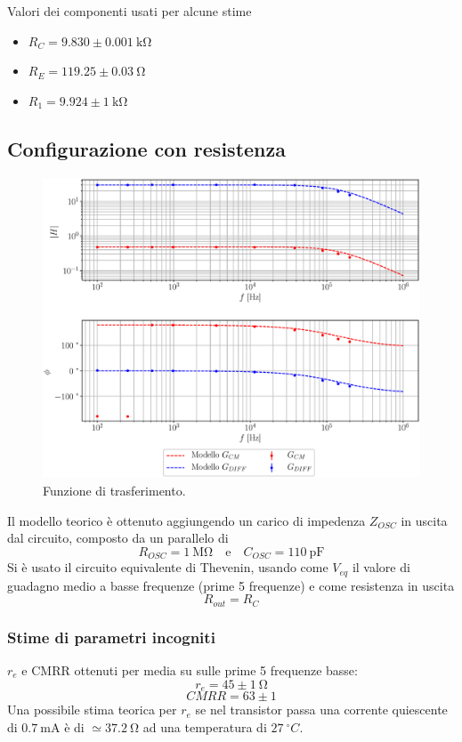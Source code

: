 \documentclass[.../presentazione_orale.tex]{subfiles}
\date{Settembre 2020}
\author{Matteo Zortea, Elena Acinapura}}
\begin{document}
\onlyinsubfile{\maketitle}

Valori dei componenti usati per alcune stime
\begin{itemize}
    \item ${R_C} = 9.830\pm0.001~\si{\kilo\ohm}$ 
    \item ${R_E} = 119.25\pm0.03~\si{\ohm}$
    \item $R_1 = 9.924\pm1~\si{\kilo\ohm}$
\end{itemize}


\subsection*{Configurazione con resistenza}
\begin{figure}[h!]
    \centering
    \includegraphics[scale = 0.6]{Grafici/resistenza.eps}
    \caption{Funzione di trasferimento.}
    \label{fig:resistenza}
\end{figure}
Il modello teorico è ottenuto aggiungendo un carico di impedenza $Z_{OSC}$ in uscita dal circuito, composto da un parallelo di $$R_{OSC} = 1~\si{\mega\ohm} \quad \text{e} \quad C_{OSC} = 110~\si{\pico\farad}$$
Si è usato il circuito equivalente di Thevenin, usando come $V_{eq}$ il valore di guadagno medio a basse frequenze (prime 5 frequenze) e come resistenza in uscita $$R_{out} = R_C$$

\subsubsection*{Stime di parametri incogniti}
$r_e$ e CMRR ottenuti per media su sulle prime 5 frequenze basse:
$$ r_e = 45\pm 1~\si{\ohm}$$
$$ CMRR = 63\pm 1$$
Una possibile stima teorica per $r_e$ se nel transistor passa una corrente quiescente di $0.7~\si{\milli\ampere}$ è di $\simeq 37.2~\si{\ohm}$ ad una temperatura di $27~^\circ C$.
\end{document}
